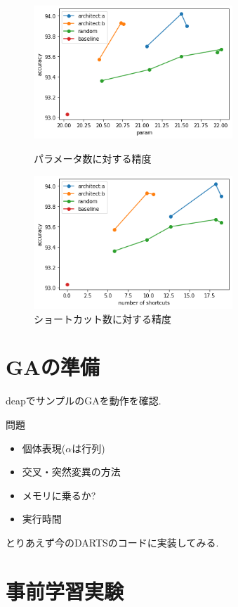 \documentclass[twocolumn]{jarticle}     %
\begin{document}
\begin{figure}[tb]
 \begin{minipage}{0.5\hsize}
 	\begin{center}
 		\includegraphics[clip,width=75mm]{param.png}
 		\caption{パラメータ数に対する精度}
 		\label{fig:param}
 	\end{center}
 \end{minipage}
 \begin{minipage}{0.5\hsize}
 	\begin{center}
 		\includegraphics[clip,width=75mm]{short.png}
 		\caption{ショートカット数に対する精度}
 		\label{fig:short}
 	\end{center}
 \end{minipage}
\end{figure}


\section{GAの準備}
deapでサンプルのGAを動作を確認.

問題
\begin{itemize}
  \item 個体表現($\alpha$は行列)
  \item 交叉・突然変異の方法
  \item メモリに乗るか?
  \item 実行時間
\end{itemize}
とりあえず今のDARTSのコードに実装してみる.

\section{事前学習実験}
\end{document}
